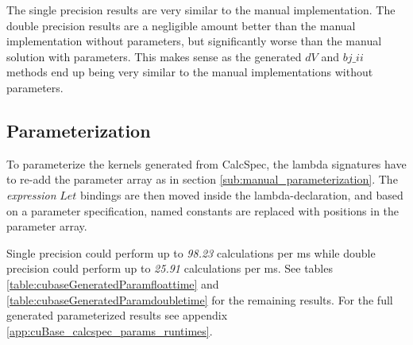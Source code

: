 The single precision results are very similar to the manual implementation.
The double precision results are a negligible amount better than the manual implementation without parameters, but significantly worse than the manual solution with parameters.
This makes sense as the generated $dV$ and $bj\_ii$ methods end up being very similar to the manual implementations without parameters.

\subsection{Parameterization}
To parameterize the kernels generated from CalcSpec, the lambda signatures have to re-add the parameter array as in section \ref{sub:manual_parameterization}.
The \emph{expression} $Let$ bindings are then moved inside the lambda-declaration, and based on a parameter specification, named constants are replaced with positions in the parameter array.

Single precision could perform up to \emph{98.23} calculations per ms while double precision could perform up to \emph{25.91} calculations per ms.
See tables \ref{table:cubaseGeneratedParamfloattime} and \ref{table:cubaseGeneratedParamdoubletime} for the remaining results.
For the full generated parameterized results see appendix \ref{app:cuBase_calcspec_params_runtimes}.

\begin{table}[h!]
\centering
{}
\caption{Parameterized CalcSpec calculations per ms with single precision\label{table:cubaseGeneratedParamfloattime}}
\end{table}

